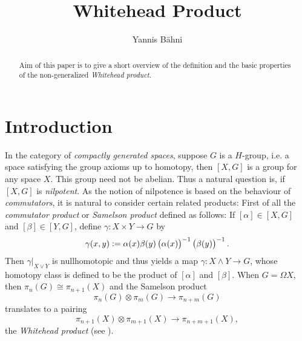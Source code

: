 

\title{Whitehead Product}
\author{Yannis B\"{a}hni}
\address[Yannis B\"{a}hni]{University of Zurich, R\"{a}mistrasse 71, 8006 Zurich}



\begin{abstract}
	Aim of this paper is to give a short overview of the definition and the basic properties of the non-generalized \emph{Whitehead product}.
\end{abstract}

\maketitle

\tableofcontents

\section{Introduction}
In the category of \emph{compactly generated spaces}, suppose $G$ is a $H$-group, i.e. a space satisfying the group axioms up to homotopy, then $[X,G]$ is a group for any space $X$. This group need not be abelian. Thus a natural question is, if $[X,G]$ is \emph{nilpotent}. As the notion of nilpotence is based on the behaviour of \emph{commutators}, it is natural to consider certain related products: First of all the \emph{commutator product} or \emph{Samelson product} defined as follows: If $[\alpha] \in [X,G]$ and $[\beta] \in [Y,G]$, define $\gamma : X \times Y \to G$ by
\begin{equation*}
	\gamma(x,y) := \alpha(x)\beta(y)\del[1]{\alpha(x)}^{-1}\del[1]{\beta(y)}^{-1}.
\end{equation*}
Then $\gamma\vert_{X \vee Y}$ is nullhomotopic and thus yields a map $\gamma : X \wedge Y \to G$, whose homotopy class is defined to be the product of $[\alpha]$ and $[\beta]$. When $G = \Omega X$, then $\pi_n(G) \cong \pi_{n + 1}(X)$ and the Samelson product
\begin{equation*}
	\pi_n(G) \otimes \pi_m(G) \to \pi_{n + m}(G)
\end{equation*}
\noindent translates to a pairing
\begin{equation*}
	\pi_{n + 1}(X) \otimes \pi_{m + 1}(X) \to \pi_{n + m + 1}(X),
\end{equation*}
\noindent the \emph{Whitehead product} (see \cite[456--457]{whitehead:homotopy_theory:1978}).

